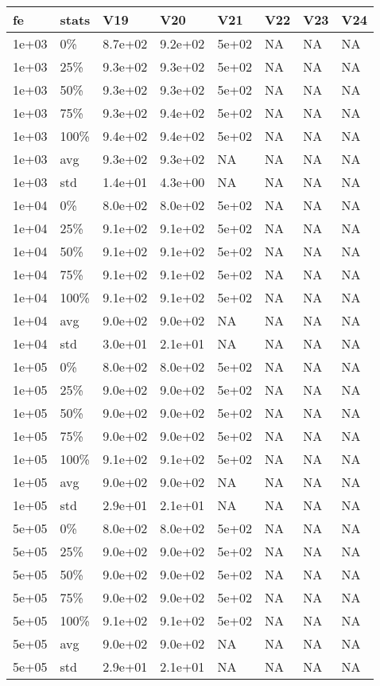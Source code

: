 \begin{longtable}{llllllll}
  \hline
fe & stats & V19 & V20 & V21 & V22 & V23 & V24 \\ 
  \hline
1e+03 & 0\% & 8.7e+02 & 9.2e+02 & 5e+02 & NA & NA & NA \\ 
  1e+03 & 25\% & 9.3e+02 & 9.3e+02 & 5e+02 & NA & NA & NA \\ 
  1e+03 & 50\% & 9.3e+02 & 9.3e+02 & 5e+02 & NA & NA & NA \\ 
  1e+03 & 75\% & 9.3e+02 & 9.4e+02 & 5e+02 & NA & NA & NA \\ 
  1e+03 & 100\% & 9.4e+02 & 9.4e+02 & 5e+02 & NA & NA & NA \\ 
  1e+03 & avg & 9.3e+02 & 9.3e+02 &    NA & NA & NA & NA \\ 
  1e+03 & std & 1.4e+01 & 4.3e+00 &    NA & NA & NA & NA \\ 
  1e+04 & 0\% & 8.0e+02 & 8.0e+02 & 5e+02 & NA & NA & NA \\ 
  1e+04 & 25\% & 9.1e+02 & 9.1e+02 & 5e+02 & NA & NA & NA \\ 
  1e+04 & 50\% & 9.1e+02 & 9.1e+02 & 5e+02 & NA & NA & NA \\ 
  1e+04 & 75\% & 9.1e+02 & 9.1e+02 & 5e+02 & NA & NA & NA \\ 
  1e+04 & 100\% & 9.1e+02 & 9.1e+02 & 5e+02 & NA & NA & NA \\ 
  1e+04 & avg & 9.0e+02 & 9.0e+02 &    NA & NA & NA & NA \\ 
  1e+04 & std & 3.0e+01 & 2.1e+01 &    NA & NA & NA & NA \\ 
  1e+05 & 0\% & 8.0e+02 & 8.0e+02 & 5e+02 & NA & NA & NA \\ 
  1e+05 & 25\% & 9.0e+02 & 9.0e+02 & 5e+02 & NA & NA & NA \\ 
  1e+05 & 50\% & 9.0e+02 & 9.0e+02 & 5e+02 & NA & NA & NA \\ 
  1e+05 & 75\% & 9.0e+02 & 9.0e+02 & 5e+02 & NA & NA & NA \\ 
  1e+05 & 100\% & 9.1e+02 & 9.1e+02 & 5e+02 & NA & NA & NA \\ 
  1e+05 & avg & 9.0e+02 & 9.0e+02 &    NA & NA & NA & NA \\ 
  1e+05 & std & 2.9e+01 & 2.1e+01 &    NA & NA & NA & NA \\ 
  5e+05 & 0\% & 8.0e+02 & 8.0e+02 & 5e+02 & NA & NA & NA \\ 
  5e+05 & 25\% & 9.0e+02 & 9.0e+02 & 5e+02 & NA & NA & NA \\ 
  5e+05 & 50\% & 9.0e+02 & 9.0e+02 & 5e+02 & NA & NA & NA \\ 
  5e+05 & 75\% & 9.0e+02 & 9.0e+02 & 5e+02 & NA & NA & NA \\ 
  5e+05 & 100\% & 9.1e+02 & 9.1e+02 & 5e+02 & NA & NA & NA \\ 
  5e+05 & avg & 9.0e+02 & 9.0e+02 &    NA & NA & NA & NA \\ 
  5e+05 & std & 2.9e+01 & 2.1e+01 &    NA & NA & NA & NA \\ 
   \hline
\hline
\end{longtable}
\newpage
